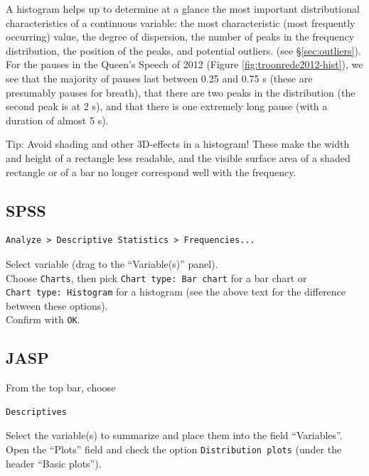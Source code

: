 \documentclass[
]{book}
\begin{document}
A histogram helps up to determine at a glance the most important distributional characteristics
of a continuous variable: the most characteristic
(most frequently occurring) value, the degree of dispersion, the
number of peaks in the frequency distribution, the position of the peaks,
and potential outliers.
(see §\ref{sec:outliers}).
For the pauses in the Queen's Speech of 2012
(Figure \ref{fig:troonrede2012-hist}), we see that the majority of pauses
last between 0.25 and 0.75 s (these are presumably pauses for breath),
that there are two peaks in the distribution (the second peak is at 2 s),
and that there is one extremely long pause (with a duration
of almost 5 s).

Tip: Avoid shading and other 3D-effects in a histogram! These
make the width and height of a rectangle less readable,
and the visible surface area of a shaded rectangle or of a bar
no longer correspond well with the frequency.

\hypertarget{spss-2}{%
\subsection{SPSS}\label{spss-2}}

\begin{verbatim}
Analyze > Descriptive Statistics > Frequencies...
\end{verbatim}

Select variable (drag to the ``Variable(s)'' panel).\\
Choose \texttt{Charts}, then pick \texttt{Chart\ type:\ Bar\ chart} for a
bar chart or \texttt{Chart\ type:\ Histogram} for a histogram (see
the above text for the difference between these options).\\
Confirm with \texttt{OK}.\\

\hypertarget{jasp-2}{%
\subsection{JASP}\label{jasp-2}}

From the top bar, choose

\begin{verbatim}
Descriptives
\end{verbatim}

Select the variable(s) to summarize and place them into the field ``Variables''. Open the ``Plots'' field and check the option \texttt{Distribution\ plots} (under the header ``Basic plots'').
\end{document}
